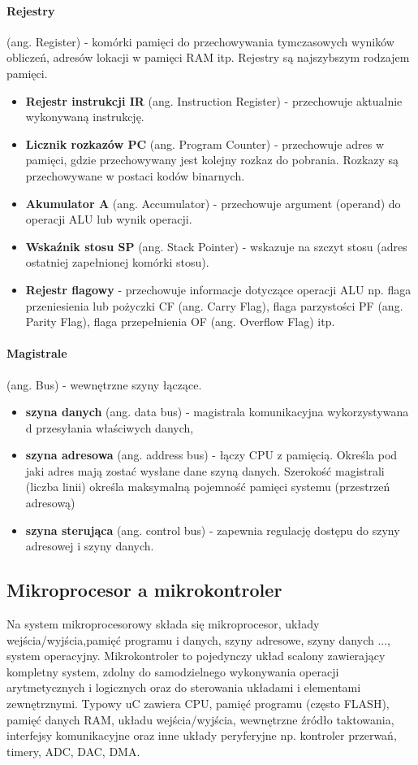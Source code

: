 \documentclass[a4paper,twoside]{report}
\begin{document}
\paragraph{Rejestry} (ang. Register) - komórki pamięci do przechowywania tymczasowych wyników obliczeń, adresów lokacji w pamięci RAM itp. Rejestry są najszybszym rodzajem pamięci.
\begin{itemize}
\item \textbf{Rejestr instrukcji IR} (ang. Instruction Register) - przechowuje aktualnie wykonywaną instrukcję.
\item\textbf{ Licznik rozkazów PC} (ang. Program Counter) - przechowuje adres w pamięci, gdzie przechowywany jest kolejny rozkaz do pobrania. Rozkazy są przechowywane w postaci kodów binarnych.
\item \textbf{Akumulator A} (ang. Accumulator) - przechowuje argument (operand) do operacji ALU lub wynik operacji.
\item \textbf{Wskaźnik stosu SP} (ang. Stack Pointer) - wskazuje na szczyt stosu (adres ostatniej zapełnionej komórki stosu).
\item \textbf{Rejestr flagowy} - przechowuje informacje dotyczące operacji ALU np. flaga przeniesienia lub pożyczki CF (ang. Carry Flag), flaga parzystości PF (ang. Parity Flag), flaga przepełnienia OF (ang. Overflow Flag) itp.
\end{itemize}

\paragraph{Magistrale} (ang. Bus) - wewnętrzne szyny łączące.
\begin{itemize}
\item \textbf{szyna danych} (ang. data bus) - magistrala komunikacyjna wykorzystywana d przesyłania właściwych danych,
\item \textbf{szyna adresowa} (ang. address bus) - łączy CPU z pamięcią. Określa pod jaki adres mają zostać wysłane dane szyną danych. Szerokość magistrali (liczba linii) określa maksymalną pojemność pamięci systemu (przestrzeń adresową)
\item \textbf{szyna sterująca} (ang. control bus) - zapewnia regulację dostępu do szyny adresowej i szyny danych.
\end{itemize}

\subsection{Mikroprocesor a mikrokontroler}
Na system mikroprocesorowy składa się mikroprocesor, układy wejścia/wyjścia,pamięć programu i danych, szyny adresowe, szyny danych ..., system operacyjny. Mikrokontroler to pojedynczy układ scalony zawierający kompletny system, zdolny do samodzielnego wykonywania operacji arytmetycznych i logicznych oraz do sterowania układami i elementami zewnętrznymi. Typowy uC zawiera CPU, pamięć programu (często FLASH), pamięć danych RAM, układu wejścia/wyjścia, wewnętrzne źródło taktowania, interfejsy komunikacyjne oraz inne układy peryferyjne np. kontroler przerwań, timery, ADC, DAC, DMA.
\end{document}
